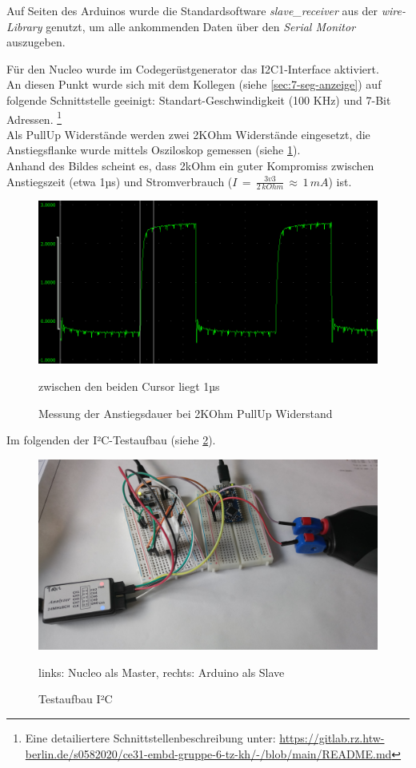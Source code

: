\documentclass[11pt,a4paper,titlepage]{article}
\begin{document}
Auf Seiten des Arduinos wurde die Standardsoftware \textit{slave\_receiver} aus der \textit{wire-Library} genutzt,
um alle ankommenden Daten über den \textit{Serial Monitor} auszugeben.

Für den Nucleo wurde im Codegerüstgenerator das I2C1-Interface aktiviert.\\
An diesen Punkt wurde sich mit dem Kollegen (siehe \cref{sec:7-seg-anzeige}) auf folgende Schnittstelle geeinigt:
Standart-Geschwindigkeit (100 KHz) und 7-Bit Adressen.
\footnote{Eine detailiertere Schnittstellenbeschreibung unter: \url{https://gitlab.rz.htw-berlin.de/s0582020/ce31-embd-gruppe-6-tz-kh/-/blob/main/README.md}}
\\

Als PullUp Widerstände werden zwei 2KOhm Widerstände eingesetzt,
die Anstiegsflanke wurde mittels Osziloskop gemessen (siehe \cref{fig:oszi_rising_falling_edges}).\\
Anhand des Bildes scheint es, dass 2kOhm ein guter Kompromiss zwischen Anstiegszeit (etwa 1µs) und Stromverbrauch ($I\,=\,\frac{3v3}{2\,kOhm}\,\approx\,1\,mA$) ist.

\begin{figure}[H]
    \centering
    \includegraphics[width=\textwidth]{Bilder-Tobit/oszi_rising_falling_edges_1.png}
    \caption{Messung der Anstiegsdauer bei 2KOhm PullUp Widerstand}
    {\small zwischen den beiden Cursor liegt 1µs}
    \label{fig:oszi_rising_falling_edges}
\end{figure}

Im folgenden der I²C-Testaufbau (siehe \cref{fig:i2c_testaufbau}).

\begin{figure}[H]
    \centering
    \includegraphics[width=\textwidth]{./Bilder-Tobit/i2c_testaufbau.jpg}
    \caption{Testaufbau I²C}
    {\small links: Nucleo als Master, rechts: Arduino als Slave}
    \label{fig:i2c_testaufbau}
\end{figure}
\end{document}
